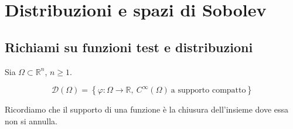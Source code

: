 \chapter{Distribuzioni e spazi di Sobolev}
\section{Richiami su funzioni test e distribuzioni}

Sia $\displaystyle \Omega \subset \mathbb{R}^{n}$, $\displaystyle n\geqslant 1$.
\begin{definition}
    \begin{equation*}
        \mathcal{D}(\Omega) =\left\{\varphi :\Omega \rightarrow \mathbb{R} ,\ C^{\infty }(\Omega) \ \text{a supporto compatto}\right\}
    \end{equation*}
\end{definition}
Ricordiamo che il supporto di una funzione è la chiusura dell'insieme dove essa non si annulla.

